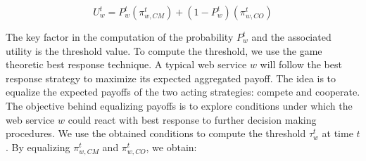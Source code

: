 \documentclass[runningheads,a4paper]{llncs}
\begin{document}
\begin{equation}\label{U}
U_w^t=P_w^t(\pi_{w,CM}^t)+(1-P_w^t)(\pi_{w,CO}^t)
\end{equation}




The key factor in the computation of the probability $P_w^t$ and
the associated utility is the threshold value. To compute the
threshold, we use the game theoretic best response technique. A
typical web service $w$ will follow the best response strategy to
maximize its expected aggregated payoff. The idea is to equalize
the expected payoffs of the two acting strategies: compete and
cooperate.
%
%
%
The objective behind equalizing payoffs is to explore conditions
under which the web service $w$ could react with best response to
further decision making procedures. We use the obtained conditions
to compute the threshold $\tau_w^t$ at time $t$. By equalizing
$\pi_{w,CM}^t$ and $\pi_{w,CO}^t$, we obtain:
\end{document}
